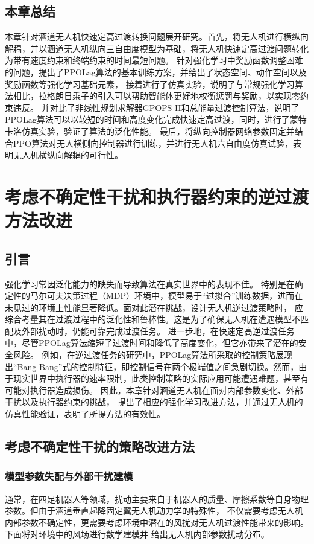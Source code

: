 \section{本章总结}
本章针对涵道无人机快速定高过渡转换问题展开研究。首先，将无人机进行横纵向解耦，并以涵道无人机纵向三自由度模型为基础，将无人机快速定高过渡问题转化为带有速度约束和终端约束的时间最短问题。
针对强化学习中奖励函数调整困难的问题，提出了PPOLag算法的基本训练方案，并给出了状态空间、动作空间以及奖励函数等强化学习基础元素，
接着进行了仿真实验，说明了与常规强化学习算法相比，拉格朗日乘子的引入可以帮助智能体更好地权衡惩罚与奖励，以实现零约束违反。
并对比了非线性规划求解器GPOPS-II和总能量过渡控制算法，说明了PPOLag算法可以以较短的时间和高度变化完成快速定高过渡，同时，进行了蒙特卡洛仿真实验，验证了算法的泛化性能。
最后，将纵向控制器网络参数固定并结合PPO算法对无人横侧向控制器进行训练，并进行无人机六自由度仿真试验，表明无人机横纵向解耦的可行性。

\chapter{考虑不确定性干扰和执行器约束的逆过渡方法改进}
\section{引言}
强化学习常因泛化能力的缺失而导致算法在真实世界中的表现不佳。
特别是在确定性的马尔可夫决策过程（MDP）环境中，模型易于“过拟合”训练数据，进而在未见过的环境上性能显著降低。面对此潜在挑战，设计无人机逆过渡策略时，
应综合考量其在过渡过程中的泛化性和鲁棒性。这是为了确保无人机在遭遇模型不匹配及外部扰动时，仍能可靠完成过渡任务。
进一步地，在快速定高逆过渡任务中，尽管PPOLag算法缩短了过渡时间和降低了高度变化，但它亦带来了潜在的安全风险。
例如，在逆过渡任务的研究中，PPOLag算法所采取的控制策略展现出“Bang-Bang”式的控制特征，即控制信号在两个极端值之间急剧切换。然而，由于现实世界中执行器的速率限制，此类控制策略的实际应用可能遭遇难题，甚至有可能对执行器造成损伤。
因此，本章针对涵道无人机在面对内部参数变化、外部干扰以及执行器约束的挑战，
提出了相应的强化学习改进方法，并通过无人机的仿真性能验证，表明了所提方法的有效性。
\section{考虑不确定性干扰的策略改进方法}
\subsection{模型参数失配与外部干扰建模}
通常，在四足机器人等领域，扰动主要来自于机器人的质量、摩擦系数等自身物理参数。但由于涵道垂直起降固定翼无人机动力学的特殊性，
不仅需要考虑无人机内部参数不确定性，更需要考虑环境中潜在的风扰对无人机过渡性能带来的影响。下面将对环境中的风场进行数学建模并
给出无人机内部参数扰动分布。
